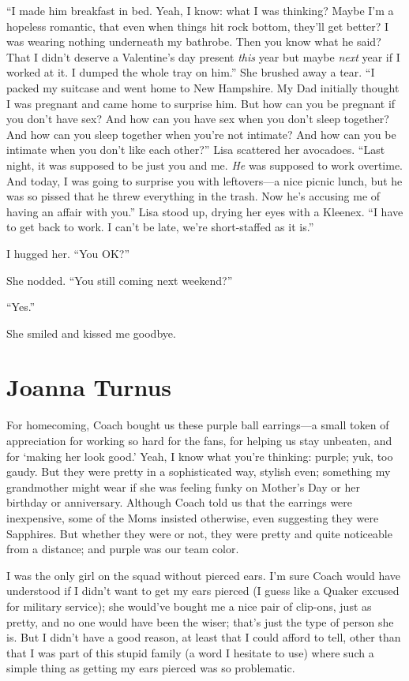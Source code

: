 ``I made him breakfast in bed. Yeah, I know: what I was thinking? Maybe
I'm a hopeless romantic, that even when things hit rock bottom, they'll
get better? I was wearing nothing underneath my bathrobe. Then you know
what he said? That I didn't deserve a Valentine's day present
\emph{this} year but maybe \emph{next} year if I worked at it. I dumped
the whole tray on him.'' She brushed away a tear. ``I packed my suitcase
and went home to New Hampshire. My Dad initially thought I was pregnant
and came home to surprise him. But how can you be pregnant if you don't
have sex? And how can you have sex when you don't sleep together? And
how can you sleep together when you're not intimate? And how can you be
intimate when you don't like each other?'' Lisa scattered her avocadoes.
``Last night, it was supposed to be just you and me. \emph{He} was
supposed to work overtime. And today, I was going to surprise you with
leftovers---a nice picnic lunch, but he was so pissed that he threw
everything in the trash. Now he's accusing me of having an affair with
you.'' Lisa stood up, drying her eyes with a Kleenex. ``I have to get
back to work. I can't be late, we're short-staffed as it is.''

I hugged her. ``You OK?''

She nodded. ``You still coming next weekend?''

``Yes.''

She smiled and kissed me goodbye.

\chapter{Joanna Turnus}

\titlemark

For homecoming, Coach bought us these purple ball earrings---a small
token of appreciation for working so hard for the fans, for helping us
stay unbeaten, and for `making her look good.' Yeah, I know what you're
thinking: purple; yuk, too gaudy. But they were pretty in a
sophisticated way, stylish even; something my grandmother might wear if
she was feeling funky on Mother's Day or her birthday or anniversary.
Although Coach told us that the earrings were inexpensive, some of the
Moms insisted otherwise, even suggesting they were Sapphires. But
whether they were or not, they were pretty and quite noticeable from a
distance; and purple was our team color.

I was the only girl on the squad without pierced ears. I'm sure Coach
would have understood if I didn't want to get my ears pierced (I guess
like a Quaker excused for military service); she would've bought me a
nice pair of clip-ons, just as pretty, and no one would have been the
wiser; that's just the type of person she is. But I didn't have a good
reason, at least that I could afford to tell, other than that I was part
of this stupid family (a word I hesitate to use) where such a simple
thing as getting my ears pierced was so problematic.\\


